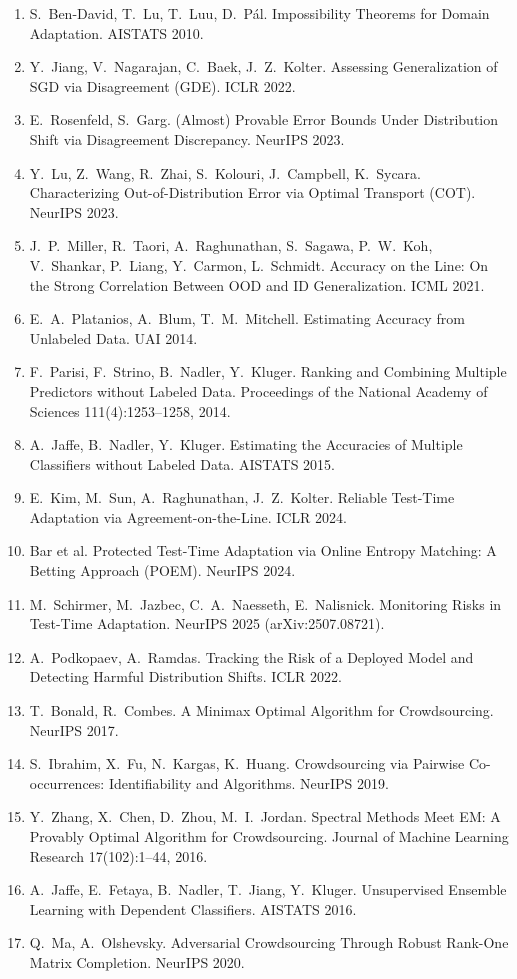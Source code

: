 \documentclass[conference]{IEEEtran}
\theoremstyle{plain}
\theoremstyle{definition}
\begin{document}
\begin{enumerate}
\item S.~Ben-David, T.~Lu, T.~Luu, D.~P\'al. Impossibility Theorems for Domain Adaptation. AISTATS 2010.
\item Y.~Jiang, V.~Nagarajan, C.~Baek, J.~Z.~Kolter. Assessing Generalization of SGD via Disagreement (GDE). ICLR 2022.
\item E.~Rosenfeld, S.~Garg. (Almost) Provable Error Bounds Under Distribution Shift via Disagreement Discrepancy. NeurIPS 2023.
\item Y.~Lu, Z.~Wang, R.~Zhai, S.~Kolouri, J.~Campbell, K.~Sycara. Characterizing Out-of-Distribution Error via Optimal Transport (COT). NeurIPS 2023.
\item J.~P.~Miller, R.~Taori, A.~Raghunathan, S.~Sagawa, P.~W.~Koh, V.~Shankar, P.~Liang, Y.~Carmon, L.~Schmidt. Accuracy on the Line: On the Strong Correlation Between OOD and ID Generalization. ICML 2021.
\item E.~A.~Platanios, A.~Blum, T.~M.~Mitchell. Estimating Accuracy from Unlabeled Data. UAI 2014.
\item F.~Parisi, F.~Strino, B.~Nadler, Y.~Kluger. Ranking and Combining Multiple Predictors without Labeled Data. Proceedings of the National Academy of Sciences 111(4):1253--1258, 2014.
\item A.~Jaffe, B.~Nadler, Y.~Kluger. Estimating the Accuracies of Multiple Classifiers without Labeled Data. AISTATS 2015.
\item E.~Kim, M.~Sun, A.~Raghunathan, J.~Z.~Kolter. Reliable Test-Time Adaptation via Agreement-on-the-Line. ICLR 2024.
\item Bar et al. Protected Test-Time Adaptation via Online Entropy Matching: A Betting Approach (POEM). NeurIPS 2024. %
\item M.~Schirmer, M.~Jazbec, C.~A.~Naesseth, E.~Nalisnick. Monitoring Risks in Test-Time Adaptation. NeurIPS 2025 (arXiv:2507.08721).
\item A.~Podkopaev, A.~Ramdas. Tracking the Risk of a Deployed Model and Detecting Harmful Distribution Shifts. ICLR 2022.
\item T.~Bonald, R.~Combes. A Minimax Optimal Algorithm for Crowdsourcing. NeurIPS 2017.
\item S.~Ibrahim, X.~Fu, N.~Kargas, K.~Huang. Crowdsourcing via Pairwise Co-occurrences: Identifiability and Algorithms. NeurIPS 2019.
\item Y.~Zhang, X.~Chen, D.~Zhou, M.~I.~Jordan. Spectral Methods Meet EM: A Provably Optimal Algorithm for Crowdsourcing. Journal of Machine Learning Research 17(102):1--44, 2016.
\item A.~Jaffe, E.~Fetaya, B.~Nadler, T.~Jiang, Y.~Kluger. Unsupervised Ensemble Learning with Dependent Classifiers. AISTATS 2016.
\item Q.~Ma, A.~Olshevsky. Adversarial Crowdsourcing Through Robust Rank-One Matrix Completion. NeurIPS 2020.
\end{enumerate}
\fi
\end{document}
